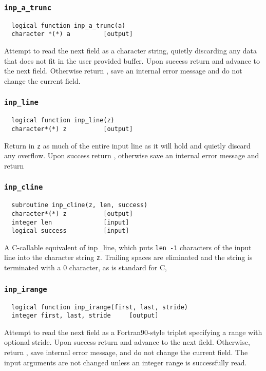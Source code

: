 \subsubsection{{\tt inp\_a\_trunc}}
\begin{verbatim}
  logical function inp_a_trunc(a)
  character *(*) a         [output]
\end{verbatim}
Attempt to read the next field as a character string, quietly
discarding any data that does not fit in the user provided buffer.
Upon success return \TRUE and advance to the next field.
Otherwise return \FALSE, save an internal error message and do
not change the current field.

\subsubsection{{\tt inp\_line}}
\begin{verbatim}
  logical function inp_line(z)
  character*(*) z          [output]
\end{verbatim}
Return in {\tt z} as much of the entire input line as it will hold and
quietly discard any overflow.  Upon success return \TRUE,
otherwise save an internal error message and return \FALSE

\subsubsection{{\tt inp\_cline}}
\begin{verbatim}
  subroutine inp_cline(z, len, success)
  character*(*) z          [output]
  integer len              [input]
  logical success          [input]
\end{verbatim}
A C-callable equivalent of inp\_line, which puts {\tt len -1} characters of
the input line into the character string {\tt z}. Trailing spaces are
eliminated and the string is terminated with a 0 character, as is
standard for C,


\subsubsection{{\tt inp\_irange}}
\begin{verbatim}
  logical function inp_irange(first, last, stride)
  integer first, last, stride     [output]
\end{verbatim}
Attempt to read the next field as a Fortran90-style triplet specifying
a range with optional stride.  Upon success return \TRUE and
advance to the next field.  Otherwise, return \FALSE, save
internal error message, and do not change the current field.  The
input arguments are not changed unless an integer range is
successfully read.

